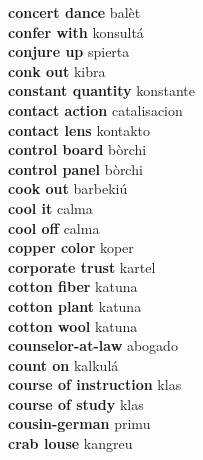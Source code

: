 \textbf{ concert dance  } balèt \\
\textbf{ confer with  } konsultá \\
\textbf{ conjure up  } spierta \\
\textbf{ conk out  } kibra \\
\textbf{ constant quantity  } konstante \\
\textbf{ contact action  } catalisacion \\
\textbf{ contact lens  } kontakto \\
\textbf{ control board  } bòrchi \\
\textbf{ control panel  } bòrchi \\
\textbf{ cook out  } barbekiú \\
\textbf{ cool it  } calma \\
\textbf{ cool off  } calma \\
\textbf{ copper color  } koper \\
\textbf{ corporate trust  } kartel \\
\textbf{ cotton fiber  } katuna \\
\textbf{ cotton plant  } katuna \\
\textbf{ cotton wool  } katuna \\
\textbf{ counselor-at-law  } abogado \\
\textbf{ count on  } kalkulá \\
\textbf{ course of instruction  } klas \\
\textbf{ course of study  } klas \\
\textbf{ cousin-german  } primu \\
\textbf{ crab louse  } kangreu \\
